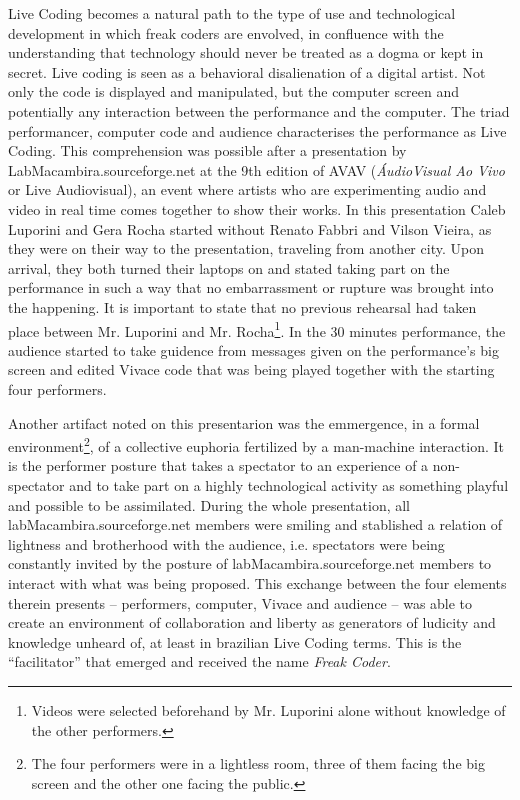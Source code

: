 \documentclass[letterpaper, 12pt]{article}
\begin{document}
Live Coding becomes a natural path to the type of use and
technological development in which freak coders are envolved, 
in confluence with the understanding that technology should never be
treated as a dogma or kept in secret. Live coding is seen as a
behavioral disalienation
of a digital artist. Not only the code is displayed and
manipulated, but the computer screen and potentially any interaction between the
performance and the computer. The triad performancer, computer code and
audience characterises the performance as Live
Coding.
This comprehension was possible after a presentation by LabMacambira.sourceforge.net
at the 9th edition of AVAV (\textit{\'{A}udioVisual Ao Vivo} or Live
Audiovisual), an event where artists who are experimenting audio and
video in real time comes together to show their works. In this
presentation Caleb Luporini and Gera Rocha started without Renato
Fabbri and Vilson Vieira, as they were on their way to the presentation,
traveling from another city. Upon arrival, they both turned their
laptops on and stated taking part on the performance in such a way
that no embarrassment or rupture was brought into the happening.
It is important to state that no previous rehearsal had taken place between
Mr. Luporini and Mr. Rocha\footnote{Videos were selected beforehand by Mr. Luporini
alone without knowledge of the other performers.}. In the 30 minutes
performance, the audience started to take guidence from messages given
on the performance's big screen and edited Vivace code that was being
played together with the starting four performers.

Another artifact noted on this presentarion was the emmergence,
in a formal environment\footnote{The four performers were in
a lightless room, three of them facing the big screen and
the other one facing the public.}, of a collective euphoria
fertilized by a man-machine interaction. It is the performer
posture that takes a spectator to an experience of a
non-spectator and to take part on a highly technological
activity as something playful and possible to be assimilated.
During the whole presentation, all labMacambira.sourceforge.net
members were smiling and stablished a relation of lightness and
brotherhood with the audience, i.e. spectators were being
constantly invited by the posture of labMacambira.sourceforge.net
members to interact with what was being proposed.
This exchange between the four elements therein presents --
performers, computer, Vivace and audience -- was able to create
an environment of collaboration and liberty as generators of
ludicity and knowledge unheard of, at least in brazilian Live Coding
terms. This is the ``facilitator'' that emerged and received the
name \emph{Freak Coder}.
\end{document}
